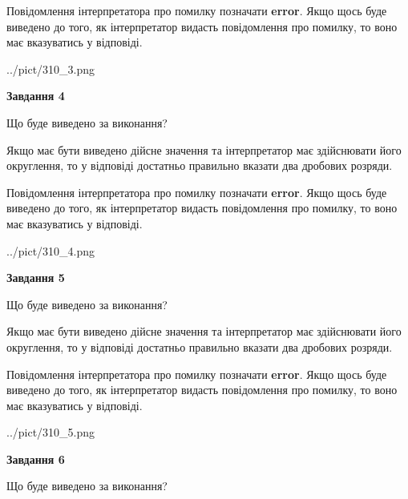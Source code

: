 \documentclass[12pt, ukrainian]{article}
\begin{document}
{\begin {Large}
Повідомлення інтерпретатора про помилку позначати \textbf{error}.
Якщо щось буде виведено до того, як інтерпретатор видасть повідомлення про помилку, 
то воно має вказуватись у відповіді. \par

\begin{center}
	{../pict/310_3.png}
\end{center}
\newpage

{\begin {center}\textbf{Завдання 4}\end {center}}\par
Що буде виведено за виконання? \par

Якщо має бути виведено дійсне значення та інтерпретатор має здійснювати його округлення, 
то у відповіді достатньо правильно вказати два дробових розряди.

Повідомлення інтерпретатора про помилку позначати \textbf{error}.
Якщо щось буде виведено до того, як інтерпретатор видасть повідомлення про помилку, 
то воно має вказуватись у відповіді. \par

\begin{center}
	{../pict/310_4.png}
\end{center}
\newpage

{\begin {center}\textbf{Завдання 5}\end {center}}\par
Що буде виведено за виконання? \par

Якщо має бути виведено дійсне значення та інтерпретатор має здійснювати його округлення, 
то у відповіді достатньо правильно вказати два дробових розряди.

Повідомлення інтерпретатора про помилку позначати \textbf{error}.
Якщо щось буде виведено до того, як інтерпретатор видасть повідомлення про помилку, 
то воно має вказуватись у відповіді. \par

\begin{center}
	{../pict/310_5.png}
\end{center}
\newpage

{\begin {center}\textbf{Завдання 6}\end {center}}\par
Що буде виведено за виконання? \par


\end{Large}}
\end{document}
